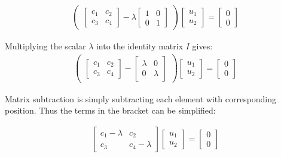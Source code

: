 \documentclass[stu,12pt,floatsintext]{apa7}
\begin{document}
\begin{gather}
    \begin{pmatrix}
        \begin{bmatrix}
        c_1 & c_2\\
        c_3 & c_4
        \end{bmatrix}-\lambda 
        \begin{bmatrix}
        1 & 0\\
        0 & 1
        \end{bmatrix}
    \end{pmatrix}
    \begin{bmatrix}
        u_1\\u_2
    \end{bmatrix}
    =\begin{bmatrix}
        0\\0
    \end{bmatrix}
\end{gather}

Multiplying the scalar $\lambda$ into the identity matrix $I$ gives:
\begin{gather}
    \begin{pmatrix}
        \begin{bmatrix}
        c_1 & c_2\\
        c_3 & c_4
        \end{bmatrix}- 
        \begin{bmatrix}
        \lambda & 0\\
        0 & \lambda
        \end{bmatrix}
    \end{pmatrix}
    \begin{bmatrix}
        u_1\\u_2
    \end{bmatrix}
    =\begin{bmatrix}
        0\\0
    \end{bmatrix}
\end{gather}

Matrix subtraction is simply subtracting each element with corresponding position. Thus the terms in the bracket can be simplified:

\begin{gather}
    \label{eq:eigen-lambda}
    \begin{bmatrix}
        c_1-\lambda & c_2\\
        c_3 & c_4-\lambda
    \end{bmatrix}
    \begin{bmatrix}
        u_1\\u_2
    \end{bmatrix}
    =\begin{bmatrix}
        0\\0
    \end{bmatrix}
\end{gather}
\end{document}
